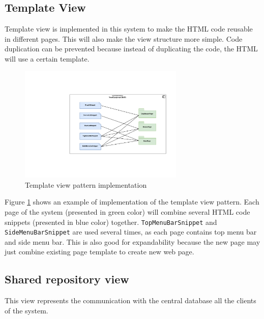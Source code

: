 \clearpage
\subsection{Template View}
\label{sec:template-view}
Template view is implemented in this system to make the HTML code reusable in different pages. This will also make the view structure more simple. Code duplication can be prevented because instead of duplicating the code, the HTML will use a certain template.

\begin{figure}[H]
	\centering
	\includegraphics[width=0.7\textwidth]{7-software/images/template-view.pdf}
	\caption{Template view pattern implementation}
	\label{fig:template-view-architecture}
\end{figure}

Figure \ref{fig:template-view-architecture} shows an example of implementation of the template view pattern. Each page of the system (presented in green color) will combine several HTML code snippets (presented in blue color) together. \texttt{TopMenuBarSnippet} and \texttt{SideMenuBarSnippet} are used several times, as each page contains top menu bar and side menu bar. This is also good for expandability because the new page may just combine existing page template to create new web page.

\subsection{Shared repository view}
This view represents the communication with the central database all the clients of the system.

